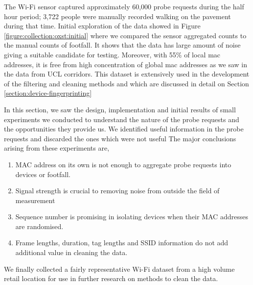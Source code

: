 The Wi-Fi sensor captured approximately 60,000 probe requests during the half hour period; 3,722 people were manually recorded walking on the pavement during that time.
Initial exploration of the data showed in Figure \ref{figure:collection:oxst:initial} where we compared the sensor aggregated counts to the manual counts of footfall.
It shows that the data has large amount of noise giving a suitable candidate for testing. 
Moreover, with 55\% of local mac addresses, it is free from high concentration of global mac addresses as we saw in the data from UCL corridors.
This dataset is extensively used in the development of the filtering and cleaning methods and which are discussed in detail on Section \ref{section:device-fingerprinting}

In this section, we saw the design, implementation and initial results of small experiments we conducted to understand the nature of the probe requests and the opportunities they provide us.
We identified useful information in the probe requests and discarded the ones which were not useful
The major conclusions arising from these experiments are,

\begin{enumerate}[rightmargin = 2em, leftmargin = 2em]
  \itemsep-0.25em
  \item MAC address on its own is not enough to aggregate probe requests into devices or footfall.
  \item Signal strength is crucial to removing noise from outside the field of measurement
  \item Sequence number is promising in isolating devices when their MAC addresses are randomised.
  \item Frame lengths, duration, tag lengths and SSID information do not add additional value in cleaning the data.
\end{enumerate}

We finally collected a fairly representative Wi-Fi dataset from a high volume retail location for use in further research on methods to clean the data.

